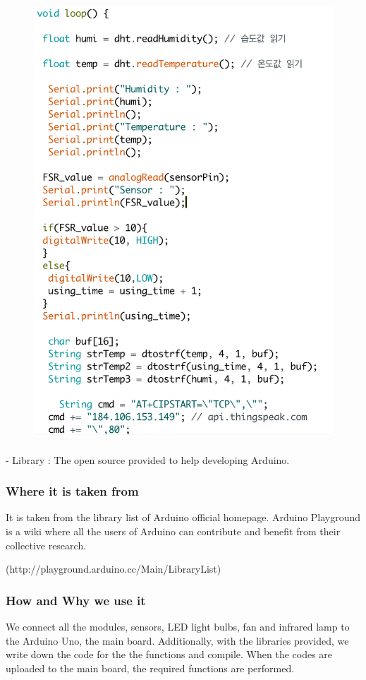 \documentclass[conference]{IEEEtran}
\begin{document}
\begin{figure}[H]
\begin{center}
    \includegraphics[scale=0.55]{loop}
  \label{fig:label}
\end{center}
\end{figure}
- Library : The open source provided to help developing Arduino.
\subsubsection{Where it is taken from} It is taken from the library list of Arduino official homepage. Arduino Playground is a wiki where all the users of Arduino can contribute and benefit from their collective research.

(http://playground.arduino.cc/Main/LibraryList)
\subsubsection{How and Why we use it}We connect all the modules, sensors, LED light bulbs, fan and infrared lamp to the Arduino Uno, the main board. Additionally, with the libraries provided, we write down the code for the the functions and compile. When the codes are uploaded to the main board, the required functions are performed.\\
\end{document}
